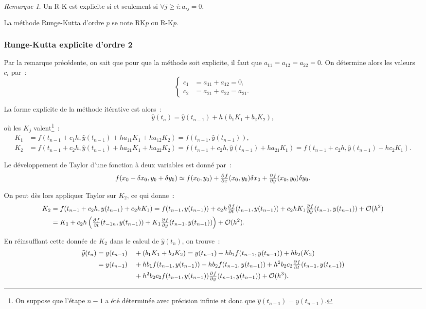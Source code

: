\documentclass{article}
\theoremstyle{definition}
\theoremstyle{remark}
\newtheorem*{rmq}{Remarque}
\begin{document}
		\begin{rmq} Un R-K est explicite si et seulement si $\forall j \geq i : a_{ij} = 0$. \end{rmq}

		La méthode Runge-Kutta d'ordre $p$ se note RK$p$ ou R-K$p$.

		\subsubsection{Runge-Kutta explicite d'ordre 2}
		Par la remarque précédente, on sait que pour que la méthode soit explicite, il faut que $a_{11} = a_{12} = a_{22} = 0$.
		On détermine alors les valeurs $c_i$ par~:
		\[\begin{cases}c_1 &= a_{11} + a_{12} = 0,\\c_2 &= a_{21} + a_{22} = a_{21}.\end{cases}\]

		La forme explicite de la méthode itérative est alors~:
		\[\widehat y(t_n) = \widehat y(t_{n-1}) + h\left(b_1K_1 + b_2K_2\right),\]
		où les $K_j$ valent\footnote{On suppose que l'étape $n-1$ a été déterminée avec précision infinie et donc que $\widehat y(t_{n-1}) = y(t_{n-1})$.}~:
		\begin{align*}
			K_1 &= f\left(t_{n-1} + c_1h, \widehat y(t_{n-1}) + ha_{11}K_1 + ha_{12}K_2\right) = f\left(t_{n-1}, \widehat y(t_{n-1})\right), \\
			K_2 &= f\left(t_{n-1} + c_2h, \widehat y(t_{n-1}) + ha_{21}K_1 + ha_{22}K_2\right) = f\left(t_{n-1} + c_2h, \widehat y(t_{n-1}) + ha_{21}K_1\right)
				= f\left(t_{n-1} + c_2h, \widehat y(t_{n-1}) + hc_2K_1\right).
		\end{align*}

		Le développement de Taylor d'une fonction à deux variables est donné par~:
		\[f(x_0 + \delta x_0, y_0 + \delta y_0) \simeq f(x_0, y_0) + \pd fx(x_0, y_0)\delta x_0 + \pd fy(x_0, y_0)\delta y_0.\]

		On peut dès lors appliquer Taylor sur $K_2$, ce qui donne~:
		\begin{align*}
			K_2 &= f(t_{n-1} + c_2h, y(t_{n-1}) + c_2hK_1) = f(t_{n-1}, y(t_{n-1})) + c_2h\pd ft(t_{n-1}, y(t_{n-1}))
					+ c_2hK_1\pd fy(t_{n-1}, y(t_{n-1})) + \mathcal O(h^2) \\
			    &= K_1 + c_2h\left(\pd ft(t_{-1n}, y(t_{n-1})) + K_1\pd fy(t_{n-1}, y(t_{n-1}))\right) + \mathcal O(h^2).
		\end{align*}

		En réinsufflant cette donnée de $K_2$ dans le calcul de $\widehat y(t_n)$, on trouve~:
		\begin{align*}
			\widehat y(t_n) &= y(t_{n-1}) &&+ (b_1K_1 + b_2K_2) = y(t_{n-1}) + hb_1f(t_{n-1}, y(t_{n-1})) + hb_2(K_2) \\
			&= y(t_{n-1}) &&+ hb_1f(t_{n-1}, y(t_{n-1})) + hb_2f(t_{n-1}, y(t_{n-1})) + h^2b_2c_2\pd ft(t_{n-1}, y(t_{n-1})) \\
			&             &&+ h^2b_2c_2f(t_{n-1}, y(t_{n-1}))\pd fy(t_{n-1}, y(t_{n-1})) + \mathcal O(h^3).
		\end{align*}
\end{document}
